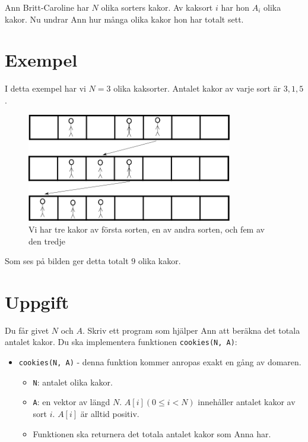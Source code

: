 \newcommand\version{v1}

Ann Britt-Caroline har $N$ olika sorters kakor. Av kaksort $i$ har hon $A_i$ olika kakor. Nu undrar Ann hur många olika kakor hon har totalt sett.

\section*{Exempel}
I detta exempel har vi $N = 3$ olika kaksorter. Antalet kakor av varje sort är $3, 1, 5$.

\begin{figure}[h!]
  \centering
  \includegraphics[width=0.8\textwidth]{sample.png}
  \caption{Vi har tre kakor av första sorten, en av andra sorten, och fem av den tredje}
\end{figure}

Som ses på bilden ger detta totalt $9$ olika kakor.

\section*{Uppgift}
Du får givet $N$ och $A$. Skriv ett program som hjälper Ann att beräkna det totala antalet kakor. Du ska implementera funktionen \texttt{cookies(N, A)}:
\begin{itemize}
  \item \texttt{cookies(N, A)} - denna funktion kommer anropas exakt en gång av domaren.
  \begin{itemize}
    \item \texttt{N}: antalet olika kakor.
    \item \texttt{A}: en vektor av längd $N$. $A[i] (0 \le i < N) $ innehåller antalet kakor av sort $i$. $A[i]$ är alltid positiv.
    \item Funktionen ska returnera det totala antalet kakor som Anna har.
  \end{itemize}
\end{itemize}

